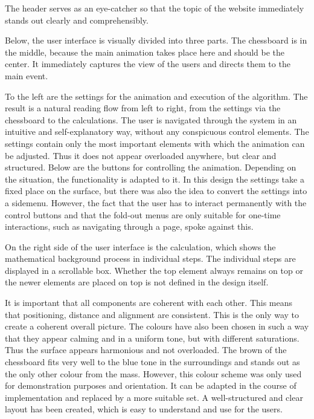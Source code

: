The header serves as an eye-catcher so that the topic of the website immediately stands out clearly and comprehensibly.

Below, the user interface is visually divided into three parts. The chessboard is in the middle, because the main animation takes place here and should be the center. It immediately captures the view of the users and directs them to the main event.

To the left are the settings for the animation and execution of the algorithm. The result is a natural reading flow from left to right, from the settings via the chessboard to the calculations. The user is navigated through the system in an intuitive and self-explanatory way, without any conspicuous control elements. The settings contain only the most important elements with which the animation can be adjusted. Thus it does not appear overloaded anywhere, but clear and structured. Below are the buttons for controlling the animation. Depending on the situation, the functionality is adapted to it. In this design the settings take a fixed place on the surface, but there was also the idea to convert the settings into a sidemenu. However, the fact that the user has to interact permanently with the control buttons and that the fold-out menus are only suitable for one-time interactions, such as navigating through a page, spoke against this.

On the right side of the user interface is the calculation, which shows the mathematical background process in individual steps. The individual steps are displayed in a scrollable box. Whether the top element always remains on top or the newer elements are placed on top is not defined in the design itself.

It is important that all components are coherent with each other. This means that positioning, distance and alignment are consistent. This is the only way to create a coherent overall picture. The colours have also been chosen in such a way that they appear calming and in a uniform tone, but with different saturations. Thus the surface appears harmonious and not overloaded. The brown of the chessboard fits very well to the blue tone in the surroundings and stands out as the only other colour from the mass. However, this colour scheme was only used for demonstration purposes and orientation. It can be adapted in the course of implementation and replaced by a more suitable set. A well-structured and clear layout has been created, which is easy to understand and use for the users.